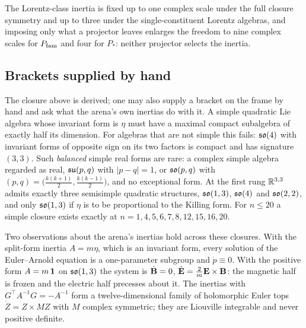 The Lorentz-class inertia is fixed up to one complex scale under the full closure symmetry and up to three under the single-constituent Lorentz
algebras, and imposing only what a projector leaves enlarges the freedom to nine complex scales for $P_{\rm fam}$ and four for $P_*$: neither projector
selects the inertia.

\subsection{Brackets supplied by hand}

The closure above is derived; one may also supply a bracket on the frame by hand and ask what the arena's own inertias do with it. A simple
quadratic Lie algebra whose invariant form is $\eta$ must have a maximal compact subalgebra of exactly half its dimension. For algebras that
are not simple this fails: $\mathfrak{so}(4)$ with invariant forms of opposite sign on its two factors is compact and has signature $(3,3)$. Such
\emph{balanced} simple real forms are rare: a complex simple algebra regarded as real, $\mathfrak{su}(p,q)$ with $|p-q|=1$, or $\mathfrak{so}(p,q)$ with $(p,q)=\bigl(\tfrac{k(k+1)}2,\tfrac{k(k-1)}2\bigr)$, and
no exceptional form. At the first rung $\mathbb{R}^{3,3}$ admits exactly three semisimple quadratic structures, $\mathfrak{so}(1,3)$, $\mathfrak{so}(4)$ and $\mathfrak{so}(2,2)$, and only
$\mathfrak{so}(1,3)$ if $\eta$ is to be proportional to the Killing form. For $n\le20$ a simple closure exists exactly at $n=1,4,5,6,7,8,12,15,16,20$.

Two observations about the arena's inertias hold across these closures. With the split-form inertia $A=m\eta$, which is an invariant form, every
solution of the Euler--Arnold equation is a one-parameter subgroup and $\dot p\equiv0$. With the positive form $A=m\,\mathbf 1$ on $\mathfrak{so}(1,3)$ the system is
$\dot{\mathbf B}=0$, $\dot{\mathbf E}=\tfrac2m\mathbf E\times\mathbf B$: the magnetic half is frozen and the electric half precesses about it. The inertias with
$G^{\!\top}A^{-1}G=-A^{-1}$ form a twelve-dimensional family of holomorphic Euler tops $\dot Z=Z\times MZ$ with $M$ complex symmetric; they are Liouville
integrable and never positive definite.

